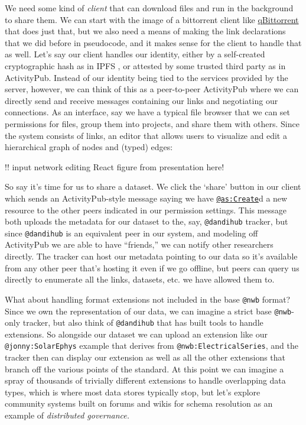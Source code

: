 \documentclass[10pt]{article}
\begin{document}
\begin{multicols}{2}
We need some kind of \emph{client} that can download files and run in
the background to share them. We can start with the image of a
bittorrent client like \href{https://www.qbittorrent.org/}{qBittorrent}
that does just that, but we also need a means of making the link
declarations that we did before in pseudocode, and it makes sense for
the client to handle that as well. Let's say our client handles our
identity, either by a self-created cryptographic hash as in IPFS\cite{benetIPFSContentAddressed2014} , or attested by some trusted
third party as in ActivityPub. Instead of our identity being tied to the
services provided by the server, however, we can think of this as a
peer-to-peer ActivityPub where we can directly send and receive messages
containing our links and negotiating our connections. As an interface,
say we have a typical file browser that we can set permissions for
files, group them into projects, and share them with others. Since the
system consists of links, an editor that allows users to visualize and
edit a hierarchical graph of nodes and (typed) edges:

!! input network editing React figure from presentation here!

So say it's time for us to share a dataset. We click the `share' button
in our client which sends an ActivityPub-style message saying we have
\href{https://www.w3.org/TR/activitystreams-vocabulary/\#dfn-create}{\texttt{@as:Create}}d
a new resource to the other peers indicated in our permission settings.
This message both uploads the metadata for our dataset to the, say,
\texttt{@dandihub} tracker, but since \texttt{@dandihub} is an
equivalent peer in our system, and modeling off ActivityPub we are able
to have ``friends,'' we can notify other researchers directly. The
tracker can host our metadata pointing to our data so it's available
from any other peer that's hosting it even if we go offline, but peers
can query us directly to enumerate all the links, datasets, etc. we have
allowed them to.

What about handling format extensions not included in the base
\texttt{@nwb} format? Since we own the representation of our data, we
can imagine a strict base \texttt{@nwb}-only tracker, but also think of
\texttt{@dandihub} that has built tools to handle extensions. So
alongside our dataset we can upload an extension like our
\texttt{@jonny:SolarEphys} example that derives from
\texttt{@nwb:ElectricalSeries}, and the tracker then can display our
extension as well as all the other extensions that branch off the
various points of the standard. At this point we can imagine a spray of
thousands of trivially different extensions to handle overlapping data
types, which is where most data stores typically stop, but let's explore
community systems built on forums and wikis for schema resolution as an
example of \emph{distributed governance.}


\end{multicols}
\end{document}
